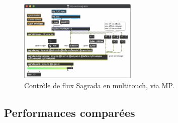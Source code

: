 \begin{figure}[!htbp]
	\captionsetup{format=plain}
	\includegraphics[width=0.5\textwidth]{gfx/04_algorithms/mp-and-sagrada.png}
	\caption[Contrôle de flux Sagrada avec MP]{Contrôle de flux Sagrada en multitouch, via MP.}
	\label{fig:algorithms:MP-and-Sagrada}
\end{figure}



\subsection{Performances comparées}

